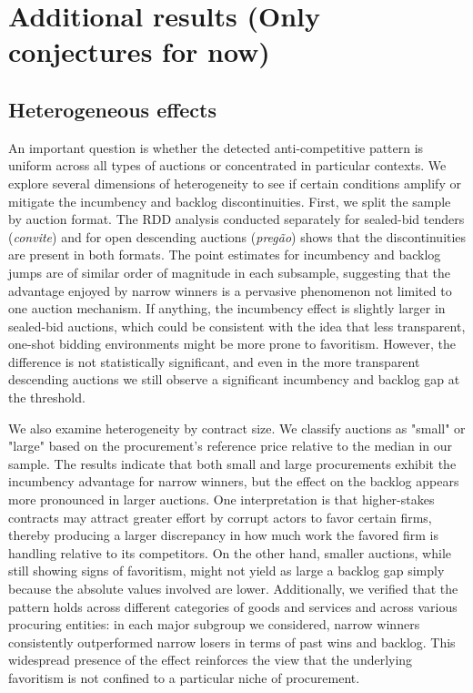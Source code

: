 \section{Additional results (Only conjectures for now)}\label{res_ar}
\subsection{Heterogeneous effects}
An important question is whether the detected anti-competitive pattern is uniform across all types of auctions or concentrated in particular contexts. We explore several dimensions of heterogeneity to see if certain conditions amplify or mitigate the incumbency and backlog discontinuities. First, we split the sample by auction format. The RDD analysis conducted separately for sealed-bid tenders (\emph{convite}) and for open descending auctions (\emph{pregão}) shows that the discontinuities are present in both formats. The point estimates for incumbency and backlog jumps are of similar order of magnitude in each subsample, suggesting that the advantage enjoyed by narrow winners is a pervasive phenomenon not limited to one auction mechanism. If anything, the incumbency effect is slightly larger in sealed-bid auctions, which could be consistent with the idea that less transparent, one-shot bidding environments might be more prone to favoritism. However, the difference is not statistically significant, and even in the more transparent descending auctions we still observe a significant incumbency and backlog gap at the threshold.

We also examine heterogeneity by contract size. We classify auctions as "small" or "large" based on the procurement's reference price relative to the median in our sample. The results indicate that both small and large procurements exhibit the incumbency advantage for narrow winners, but the effect on the backlog appears more pronounced in larger auctions. One interpretation is that higher-stakes contracts may attract greater effort by corrupt actors to favor certain firms, thereby producing a larger discrepancy in how much work the favored firm is handling relative to its competitors. On the other hand, smaller auctions, while still showing signs of favoritism, might not yield as large a backlog gap simply because the absolute values involved are lower. Additionally, we verified that the pattern holds across different categories of goods and services and across various procuring entities: in each major subgroup we considered, narrow winners consistently outperformed narrow losers in terms of past wins and backlog. This widespread presence of the effect reinforces the view that the underlying favoritism is not confined to a particular niche of procurement.

